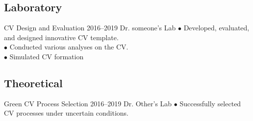 \documentclass{article}
\begin{document}


\newpage
\makebacksidebar


\subsection{Laboratory}
\begin{cvtable}[1.5]
    \customcvitem
            {\faUniversity}
            {CV Design and Evaluation} 
            {2016--2019}
            {Dr.  someone's Lab}
            {$\bullet$ Developed, evaluated, and designed innovative CV template.\\
     $\bullet$ Conducted various analyses on the CV. \\
     $\bullet$ Simulated CV formation }
\end{cvtable}

\subsection{Theoretical}
    \begin{cvtable}[1.5]
	\customcvitem
                {\faUniversity}
                {Green CV Process Selection}
                {2016--2019}
                {Dr. Other's Lab}
                {$\bullet$ Successfully selected CV processes under uncertain conditions. \\

}

	
\end{cvtable}

{}
\end{document}
